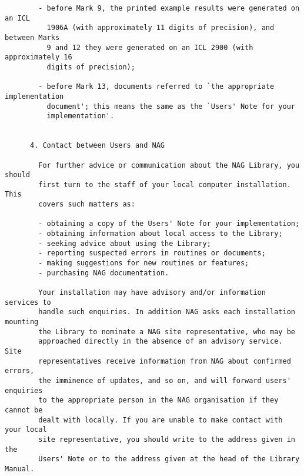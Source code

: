 \begin{small}
\begin{verbatim}
        - before Mark 9, the printed example results were generated on an ICL     
          1906A (with approximately 11 digits of precision), and between Marks    
          9 and 12 they were generated on an ICL 2900 (with approximately 16      
          digits of precision);                                                   
                                                                                  
        - before Mark 13, documents referred to `the appropriate implementation   
          document'; this means the same as the `Users' Note for your             
          implementation'.                                                        
                                                                                  
                                                                                  
      4. Contact between Users and NAG                                            
                                                                                  
        For further advice or communication about the NAG Library, you should     
        first turn to the staff of your local computer installation. This         
        covers such matters as:                                                   
                                                                                  
        - obtaining a copy of the Users' Note for your implementation;            
        - obtaining information about local access to the Library;                
        - seeking advice about using the Library;                                 
        - reporting suspected errors in routines or documents;                    
        - making suggestions for new routines or features;                        
        - purchasing NAG documentation.                                           
                                                                                  
        Your installation may have advisory and/or information services to        
        handle such enquiries. In addition NAG asks each installation mounting    
        the Library to nominate a NAG site representative, who may be             
        approached directly in the absence of an advisory service. Site           
        representatives receive information from NAG about confirmed errors,      
        the imminence of updates, and so on, and will forward users' enquiries    
        to the appropriate person in the NAG organisation if they cannot be       
        dealt with locally. If you are unable to make contact with your local     
        site representative, you should write to the address given in the         
        Users' Note or to the address given at the head of the Library Manual.    
                                                                                  

\end{verbatim}
\end{small}
